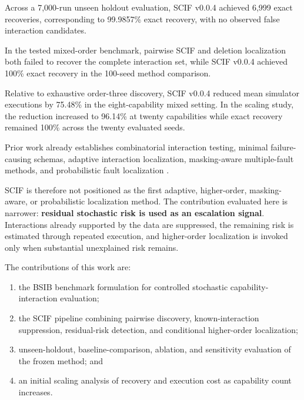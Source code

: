 Across a 7,000-run unseen holdout evaluation, SCIF v0.0.4 achieved 6,999 exact recoveries, corresponding to 99.9857\% exact recovery, with no observed false interaction candidates.

In the tested mixed-order benchmark, pairwise SCIF and deletion localization both failed to recover the complete interaction set, while SCIF v0.0.4 achieved 100\% exact recovery in the 100-seed method comparison.

Relative to exhaustive order-three discovery, SCIF v0.0.4 reduced mean simulator executions by 75.48\% in the eight-capability mixed setting. In the scaling study, the reduction increased to 96.14\% at twenty capabilities while exact recovery remained 100\% across the twenty evaluated seeds.

Prior work already establishes combinatorial interaction testing, minimal failure-causing schemas, adaptive interaction localization, masking-aware multiple-fault methods, and probabilistic fault localization \cite{kuhn2008beyond, nie2011mfs, zhang2011fic, yilmaz2014masking, niu2020multiple, nishiura2024frog}.

SCIF is therefore not positioned as the first adaptive, higher-order, masking-aware, or probabilistic localization method. The contribution evaluated here is narrower: \textbf{residual stochastic risk is used as an escalation signal}. Interactions already supported by the data are suppressed, the remaining risk is estimated through repeated execution, and higher-order localization is invoked only when substantial unexplained risk remains.

The contributions of this work are:

\begin{enumerate}
\def\labelenumi{\arabic{enumi}.}
\tightlist
\item
  the BSIB benchmark formulation for controlled stochastic capability-interaction evaluation;
\item
  the SCIF pipeline combining pairwise discovery, known-interaction suppression, residual-risk detection, and conditional higher-order localization;
\item
  unseen-holdout, baseline-comparison, ablation, and sensitivity evaluation of the frozen method; and
\item
  an initial scaling analysis of recovery and execution cost as capability count increases.
\end{enumerate}
